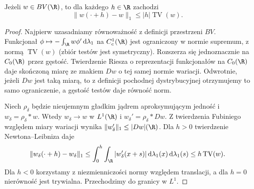 \begin{lemat}
\label{lem:pde24-bv-translation}
Jeżeli $w\in BV(\R)$, to dla każdego $h\in\R$ zachodzi
\[
 \|w(\cdot+h)-w\|_1\le |h|\operatorname{TV}(w).
\]
\end{lemat}
\begin{proof}
Najpierw uzasadniamy równoważność z definicji przestrzeni
$BV$. Funkcjonał $\phi\mapsto-\int_\R w\phi'\,
\mathrm d\lambda_1$ na $C_c^1(\R)$ jest ograniczony
w normie supremum, z normą $\operatorname{TV}(w)$
(zbiór testów jest symetryczny). Rozszerza się
jednoznacznie na $C_0(\R)$ przez gęstość. Twierdzenie
Riesza o reprezentacji funkcjonałów na $C_0(\R)$ daje
skończoną miarę ze znakiem $Dw$ o tej samej normie
wariacji. Odwrotnie, jeżeli $Dw$ jest taką miarą,
to z definicji pochodnej dystrybucyjnej otrzymujemy
to samo ograniczenie, a gęstość testów daje równość norm.

Niech $\rho_\delta$ będzie nieujemnym gładkim jądrem
aproksymującym jedność i $w_\delta=\rho_\delta*w$.
Wtedy $w_\delta\to w$ w $L^1(\R)$ i
$w_\delta'=\rho_\delta*Dw$. Z twierdzenia Fubiniego
względem miary wariacji wynika
$\|w_\delta'\|_1\le |Dw|(\R)$.
Dla $h>0$ twierdzenie Newtona--Leibniza daje
\[
 \|w_\delta(\cdot+h)-w_\delta\|_1
 \le\int_0^h\int_\R|w_\delta'(x+s)|
 \,\mathrm d\lambda_1(x)\,\mathrm d\lambda_1(s)
 \le h\operatorname{TV}(w).
\]
Dla $h<0$ korzystamy z niezmienniczości normy względem
translacji, a dla $h=0$ nierówność jest trywialna.
Przechodzimy do granicy w $L^1$.
\end{proof}

